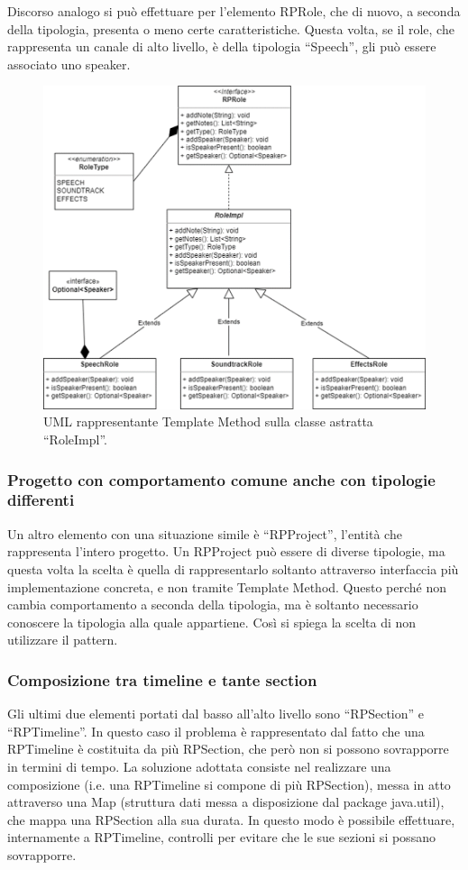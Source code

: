 \documentclass[a4paper,12pt]{report}
\begin{document}
Discorso analogo si può effettuare per l’elemento RPRole, che di nuovo, a seconda della tipologia, presenta o meno certe caratteristiche. Questa volta, se il role, che rappresenta un canale di alto livello, è della tipologia “Speech”, gli può essere associato uno speaker.

\begin{figure}[h]
\centering{}
\includegraphics[width=\textwidth,scale=1]{img/role.png}
\caption{UML rappresentante Template Method sulla classe astratta “RoleImpl”.}
\end{figure}

\subsubsection{Progetto con comportamento comune anche con tipologie differenti}
Un altro elemento con una situazione simile è “RPProject”, l’entità che rappresenta l’intero progetto. Un RPProject può essere di diverse tipologie, ma questa volta la scelta è quella di rappresentarlo soltanto attraverso interfaccia più implementazione concreta, e non tramite Template Method. Questo perché non cambia comportamento a seconda della tipologia, ma è soltanto necessario conoscere la tipologia alla quale appartiene. Così si spiega la scelta di non utilizzare il pattern.

\subsubsection{Composizione tra timeline e tante section}
Gli ultimi due elementi portati dal basso all’alto livello sono “RPSection” e “RPTimeline”. In questo caso il problema è rappresentato dal fatto che una RPTimeline è costituita da più RPSection, che però non si possono sovrapporre in termini di tempo. La soluzione adottata consiste nel realizzare una composizione (i.e. una RPTimeline si compone di più RPSection), messa in atto attraverso una Map (struttura dati messa a disposizione dal package java.util), che mappa una RPSection alla sua durata. In questo modo è possibile effettuare, internamente a RPTimeline, controlli per evitare che le sue sezioni si possano sovrapporre.
\end{document}
